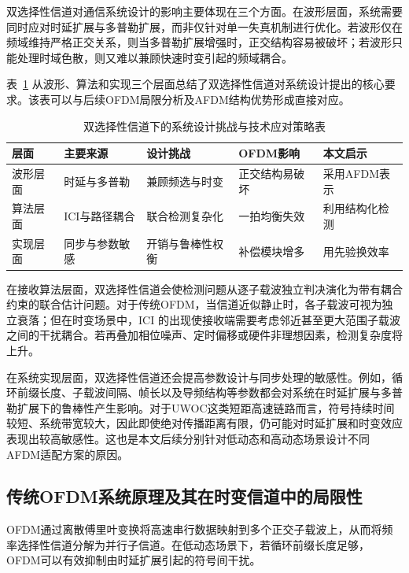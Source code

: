 双选择性信道对通信系统设计的影响主要体现在三个方面。在波形层面，系统需要同时应对时延扩展与多普勒扩展，而非仅针对单一失真机制进行优化。若波形仅在频域维持严格正交关系，则当多普勒扩展增强时，正交结构容易被破坏；若波形只能处理时域色散，则又难以兼顾快速时变引起的频域耦合。

表~\ref{tab:doubly_selective_design_impact} 从波形、算法和实现三个层面总结了双选择性信道对系统设计提出的核心要求。该表可以与后续OFDM局限分析及AFDM结构优势形成直接对应。

\begin{table}[htbp]
    \centering
    \caption{双选择性信道下的系统设计挑战与技术应对策略表}
    \label{tab:doubly_selective_design_impact}
    \footnotesize
    \setlength{\tabcolsep}{4pt}
    \begin{tabular}{p{1.7cm}p{2.3cm}p{2.5cm}p{2.3cm}p{2.7cm}}
        \toprule
        层面 & 主要来源 & 设计挑战 &OFDM影响 & 本文启示 \\
        \midrule
        波形层面 & 时延与多普勒 & 兼顾频选与时变 & 正交结构易破坏 & 采用AFDM表示 \\
        算法层面 &ICI与路径耦合 & 联合检测复杂化 & 一拍均衡失效 & 利用结构化检测 \\
        实现层面 & 同步与参数敏感 & 开销与鲁棒性权衡 & 补偿模块增多 & 用先验换效率 \\
        \bottomrule
    \end{tabular}
\end{table}

在接收算法层面，双选择性信道会使检测问题从逐子载波独立判决演化为带有耦合约束的联合估计问题。对于传统OFDM，当信道近似静止时，各子载波可视为独立衰落；但在时变场景中，ICI 的出现使接收端需要考虑邻近甚至更大范围子载波之间的干扰耦合。若再叠加相位噪声、定时偏移或硬件非理想因素，检测复杂度将上升。

在系统实现层面，双选择性信道还会提高参数设计与同步处理的敏感性。例如，循环前缀长度、子载波间隔、帧长以及导频结构等参数都会对系统在时延扩展与多普勒扩展下的鲁棒性产生影响。对于UWOC这类短距高速链路而言，符号持续时间较短、系统带宽较大，因此即使绝对传播距离有限，仍可能对时延扩展和时变效应表现出较高敏感性。这也是本文后续分别针对低动态和高动态场景设计不同AFDM适配方案的原因。

\subsection{传统OFDM系统原理及其在时变信道中的局限性}
\label{sec:ofdm_limitations}

OFDM通过离散傅里叶变换将高速串行数据映射到多个正交子载波上，从而将频率选择性信道分解为并行子信道\cite{armstrongOFDMOpticalCommunications2009}。在低动态场景下，若循环前缀长度足够，OFDM可以有效抑制由时延扩展引起的符号间干扰。

